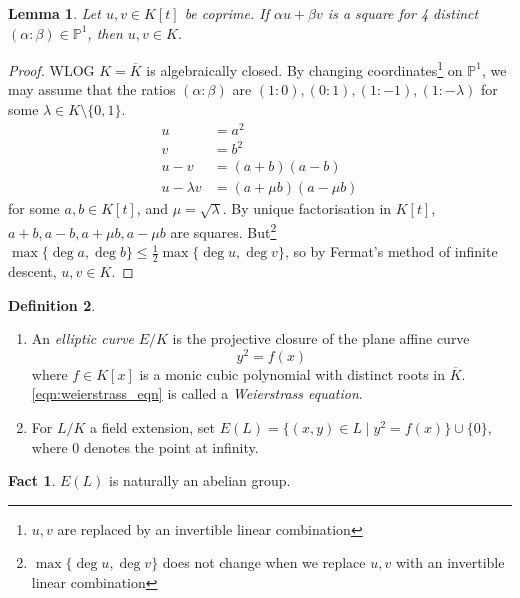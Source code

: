 \documentclass[11pt]{article}
\theoremstyle{definition}
\newtheorem{definition}{Definition}[section]
\newtheorem*{fact}{Fact}
\theoremstyle{plain}
\newtheorem{lemma}[definition]{Lemma}
\theoremstyle{remark}
\newcommand{\PP}{\mathbb{P}}
\begin{document}
\begin{lemma}\label{lem:1_4}
    Let $u, v \in K[t]$ be coprime. If $\alpha u + \beta v$ is a square for 4 distinct $(\alpha : \beta) \in \PP^1$, then $u, v \in K$.
\end{lemma}
\begin{proof}
    WLOG $K = \overline{K}$ is algebraically closed. By changing coordinates\footnote{$u, v$ are replaced by an invertible linear combination} on $\PP^1$, we may assume that the ratios $(\alpha : \beta)$ are $(1 : 0), (0 : 1), (1 : -1), (1 : -\lambda)$ for some $\lambda \in K \setminus \{0,1\}$.
    \begin{align*}
        u &= a^2\\
        v &= b^2\\
        u-v &= (a+b)(a-b)\\
        u-\lambda v &= (a+\mu b)(a-\mu b)
    \end{align*}
    for some $a, b \in K[t]$, and $\mu = \sqrt{\lambda}$. By unique factorisation in $K[t]$, $a+b, a-b, a+\mu b, a-\mu b$ are squares. But\footnote{$\max\{\deg{u}, \deg{v}\}$ does not change when we replace $u, v$ with an invertible linear combination} $\max\{\deg{a}, \deg{b}\} \le \frac{1}{2} \max\{\deg{u}, \deg{v}\}$, so by Fermat's method of infinite descent, $u, v \in K$.
\end{proof}

\begin{definition}\label{def:1_5}\phantom{}
    \begin{enumerate}
        \item An \emph{elliptic curve} $E/K$ is the projective closure of the plane affine curve
            \begin{equation}\label{eqn:weierstrass_eqn}
                y^2 = f(x)
            \end{equation}
            where $f \in K[x]$ is a monic cubic polynomial with distinct roots in $\overline{K}$. \eqref{eqn:weierstrass_eqn} is called a \emph{Weierstrass equation}.

        \item For $L/K$ a field extension, set $E(L) = \{(x, y) \in L \mid y^2 = f(x)\} \cup \{0\}$, where $0$ denotes the point at infinity.
    \end{enumerate}
\end{definition}

\begin{fact}
    $E(L)$ is naturally an abelian group.
\end{fact}
\end{document}
